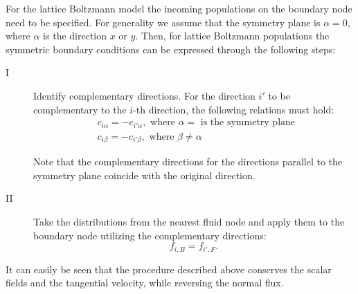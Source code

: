 \documentclass{article}
\begin{document}
For the lattice Boltzmann model the incoming populations on the boundary node need to be specified.
For generality we assume that the symmetry plane is $\alpha=0$, where $\alpha$ is the
direction $x$ or $y$. Then, for lattice Boltzmann populations the symmetric boundary conditions can
be expressed through the following steps:
\begin{description}
\item[I] Identify complementary directions. For the direction $i'$ to be complementary to the $i$-th
direction, the following relations must hold:
\begin{equation}
\begin{aligned}
&c_{i\alpha}=-c_{i'\alpha}, \text{ where $\alpha=$ is the symmetry plane }\\
&c_{i\beta}=-c_{i'\beta}, \text{ where $\beta\neq\alpha$ }
\end{aligned}
\end{equation}

Note that the complementary directions for the directions parallel to the symmetry plane coincide
with the original direction.

\item[II] Take the distributions from the nearest fluid node and
apply them to the boundary node utilizing the complementary directions:
\begin{equation}
f_{i,B}=f_{i',F}.
\end{equation}
\end{description}

It can easily be seen that the procedure described above conserves the scalar fields and the tangential
velocity, while reversing the normal flux. 


\end{document}
